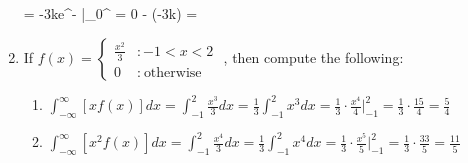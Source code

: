 \documentclass[basic, header]{nosvagor-notes}
\begin{document}
\begin{enumerate}[label=(\alph*), itemsep=1.5em, leftmargin=2em]
      = -3ke^{-} \bigg|_{0}^{\infty} = 0 - (-3k) = 
      \)
    \item If \(\displaystyle f(x) =
    \begin{cases}
      \frac{x^2}{3} &: -1 < x < 2 \\
      0 &: ~\text{otherwise}~
    \end{cases}
    \) , then compute the following:
    \begin{enumerate}[label=(\roman*)]
      \item \(\displaystyle \int_{-\infty}^{\infty} \left[ xf(x) \right] dx
          = \int_{-1}^{2} \frac{x^3}{3} dx = \frac{1}{3} \int_{-1}^{2} x^3 dx= \frac{1}{3} \cdot \frac{x^4}{4}\bigg|_{-1}^{2}
          = \frac{1}{3} \cdot \frac{15}{4} = \boxed{\frac{5}{4}}
          \)
      \item \(\displaystyle \int_{-\infty}^{\infty} \left[ x^2f(x) \right] dx
          = \int_{-1}^{2} \frac{x^4}{3} dx = \frac{1}{3} \int_{-1}^{2} x^4 dx= \frac{1}{3} \cdot \frac{x^5}{5}\bigg|_{-1}^{2}
          = \frac{1}{3} \cdot \frac{33}{5} = \boxed{\frac{11}{5}}
          \)
    \end{enumerate}
\end{enumerate}

\vspace{2em}
\end{document}
